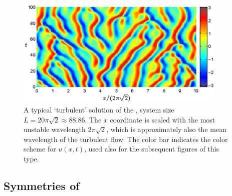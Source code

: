 \begin{figure}[t]
\begin{center}
\includegraphics[width=0.9\textwidth]{figs_bmp/ks_largeL_cbar.eps}
\end{center}
\caption{
A typical `turbulent' solution of the \KSe, system size
$L=20\pi\sqrt{2}\approx 88.86$.  The $x$ coordinate is scaled
with the most unstable wavelength $2\pi\sqrt{2}$, which is
approximately also the mean wavelength of the turbulent flow.
The color bar indicates the color scheme for $u(x,t)$, used also
for the subsequent figures of this type.
     } \label{f:ks_largeL}
\end{figure}

\subsection{Symmetries of \KSe}
\label{sec:KSeSymm}

